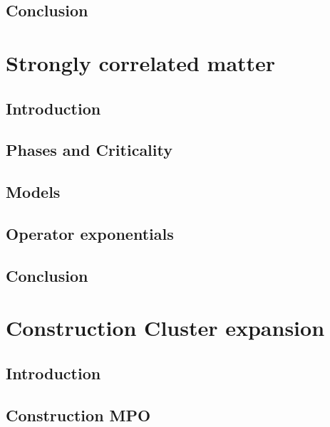 \documentclass{book}
\newcounter{a}
\newcounter{b}
\begin{document}


\section{Conclusion}


\chapter{Strongly correlated matter}

\section{Introduction}


\section{Phases and Criticality} \label{sec:PhasesAndCrit}


\section{Models}


\section{Operator exponentials}


\section{Conclusion}


\chapter{Construction Cluster expansion}

\section{Introduction}


\section{Construction MPO}

\end{document}
